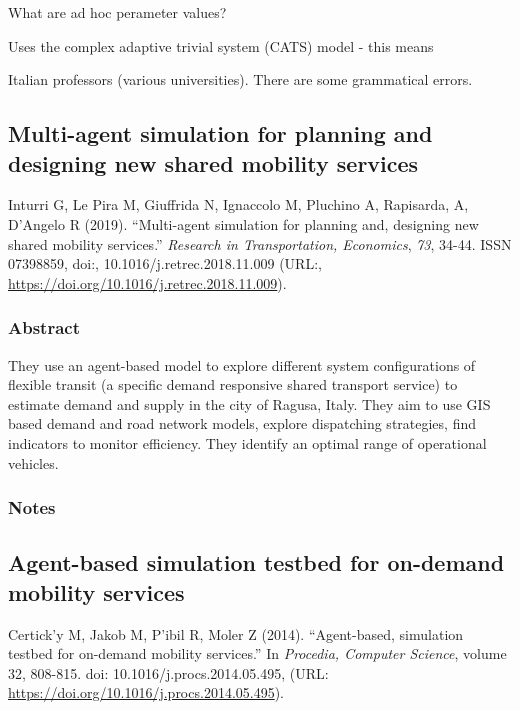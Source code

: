 \documentclass[
]{article}
\begin{document}
What are ad hoc perameter values?

Uses the complex adaptive trivial system (CATS) model - this means

Italian professors (various universities). There are some grammatical
errors.

\hypertarget{multi-agent-simulation-for-planning-and-designing-new-shared-mobility-services}{%
\subsection{Multi-agent simulation for planning and designing new shared
mobility
services}\label{multi-agent-simulation-for-planning-and-designing-new-shared-mobility-services}}

Inturri G, Le Pira M, Giuffrida N, Ignaccolo M, Pluchino A, Rapisarda,
A, D'Angelo R (2019). ``Multi-agent simulation for planning and,
designing new shared mobility services.'' \emph{Research in
Transportation, Economics}, \emph{73}, 34-44. ISSN 07398859, doi:,
10.1016/j.retrec.2018.11.009 (URL:,
\url{https://doi.org/10.1016/j.retrec.2018.11.009}).

\hypertarget{abstract-12}{%
\subsubsection{Abstract}\label{abstract-12}}

They use an agent-based model to explore different system configurations
of flexible transit (a specific demand responsive shared transport
service) to estimate demand and supply in the city of Ragusa, Italy.
They aim to use GIS based demand and road network models, explore
dispatching strategies, find indicators to monitor efficiency. They
identify an optimal range of operational vehicles.

\hypertarget{notes-12}{%
\subsubsection{Notes}\label{notes-12}}

\hypertarget{agent-based-simulation-testbed-for-on-demand-mobility-services}{%
\subsection{Agent-based simulation testbed for on-demand mobility
services}\label{agent-based-simulation-testbed-for-on-demand-mobility-services}}

Certick'y M, Jakob M, P'ibil R, Moler Z (2014). ``Agent-based,
simulation testbed for on-demand mobility services.'' In \emph{Procedia,
Computer Science}, volume 32, 808-815. doi: 10.1016/j.procs.2014.05.495,
(URL: \url{https://doi.org/10.1016/j.procs.2014.05.495}).
\end{document}
